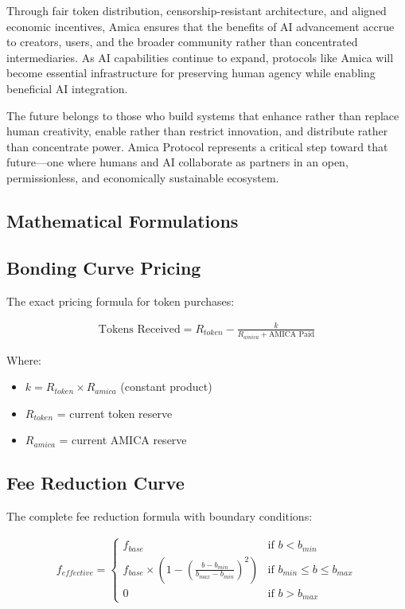\documentclass{article}
\begin{document}
Through fair token distribution, censorship-resistant architecture, and aligned economic incentives, Amica ensures that the benefits of AI advancement accrue to creators, users, and the broader community rather than concentrated intermediaries. As AI capabilities continue to expand, protocols like Amica will become essential infrastructure for preserving human agency while enabling beneficial AI integration.

The future belongs to those who build systems that enhance rather than replace human creativity, enable rather than restrict innovation, and distribute rather than concentrate power. Amica Protocol represents a critical step toward that future—one where humans and AI collaborate as partners in an open, permissionless, and economically sustainable ecosystem.

\begin{appendices}

\section{Mathematical Formulations}

\subsection{Bonding Curve Pricing}

The exact pricing formula for token purchases:

\begin{align}
\text{Tokens Received} = R_{token} - \frac{k}{R_{amica} + \text{AMICA Paid}}
\end{align}

Where:
\begin{itemize}
    \item $k = R_{token} \times R_{amica}$ (constant product)
    \item $R_{token}$ = current token reserve
    \item $R_{amica}$ = current AMICA reserve
\end{itemize}

\subsection{Fee Reduction Curve}

The complete fee reduction formula with boundary conditions:

\begin{align}
f_{effective} = \begin{cases}
f_{base} & \text{if } b < b_{min} \\
f_{base} \times \left(1 - \left(\frac{b - b_{min}}{b_{max} - b_{min}}\right)^2\right) & \text{if } b_{min} \leq b \leq b_{max} \\
0 & \text{if } b > b_{max}
\end{cases}
\end{align}


\end{appendices}
\end{document}
